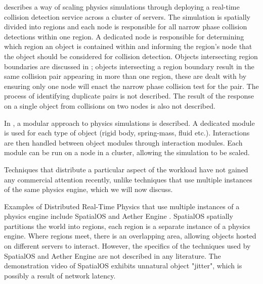 \cite{Morgan2005} describes a way of scaling physics simulations through deploying a real-time collision detection service across a cluster of servers. The simulation is spatially divided into regions and each node is responsible for all narrow phase collision detections within one region. A dedicated node is responsible for determining which region an object is contained within and informing the region's node that the object should be considered for collision detection.
Objects intersecting region boundaries are discussed in \cite{Morgan2005}; objects intersecting a region boundary result in the same collision pair appearing in more than one region, these are dealt with by ensuring only one node will enact the narrow phase collision test for the pair. The process of identifying duplicate pairs is not described. The result of the response on a single object from collisions on two nodes is also not described.


In \cite{allard2006distributed}, a modular approach to physics simulations is described. A dedicated module is used for each type of object (rigid body, spring-mass, fluid etc.). Interactions are then handled between object modules through interaction modules. Each module can be run on a node in a cluster, allowing the simulation to be scaled.

Techniques that distribute a particular aspect of the workload have not gained any commercial attention recently, unlike techniques that use multiple instances of the same physics engine, which we will now discuss.

Examples of Distributed Real-Time Physics that use multiple instances of a physics engine include SpatialOS \cite{SpatialOS} and Aether Engine \cite{AetherEngine}. SpatialOS spatially partitions the world into regions, each region is a separate instance of a physics engine. Where regions meet, there is an overlapping area, allowing objects hosted on different servers to interact. However, the specifics of the techniques used by SpatialOS and Aether Engine are not described in any literature. The demonstration video of SpatialOS exhibits unnatural object "jitter", which is possibly a result of network latency.

